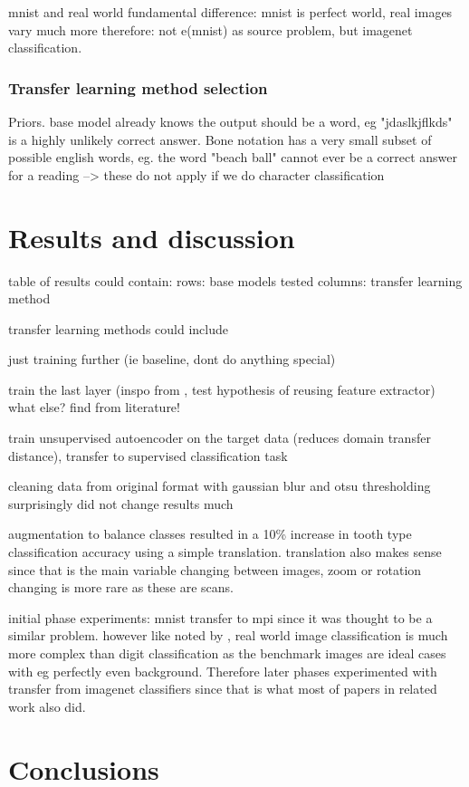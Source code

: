 \documentclass{article}
\begin{document}
mnist and real world fundamental difference: mnist is perfect world, real images vary much more \cite{alexnet}
therefore: not e(mnist) as source problem, but imagenet classification.

\subsubsection{Transfer learning method selection}
Priors. base model already knows the output should be a word, eg "jdaslkjflkds" is a highly unlikely
correct answer.
Bone notation has a very small subset of possible english words, eg. the word "beach ball" cannot ever be a correct 
answer for a reading
--> these do not apply if we do character classification


\section{Results and discussion}



table of results could contain:
rows: base models tested 
columns: transfer learning method 

transfer learning methods could include 

just training further (ie baseline, dont do anything special)

train the last layer (inspo from \cite{tibetan_ocr}, test hypothesis of reusing feature extractor)
what else? find from literature!

train unsupervised autoencoder on the target data (reduces domain transfer distance),
transfer to supervised classification task

cleaning data from original format with gaussian blur and otsu thresholding surprisingly did not 
change results much 

augmentation to balance classes resulted in a 10\% increase in tooth type classification accuracy 
using a simple translation. translation also makes sense since that is the main variable changing 
between images, zoom or rotation changing is more rare as these are scans.

initial phase experiments: mnist transfer to mpi since it was thought to be a similar problem. 
however like noted by \cite{alexnet}, real world image classification is much more complex than digit classification 
as the benchmark images are ideal cases with eg perfectly even background. Therefore later phases 
experimented with transfer from imagenet classifiers since that is what most of papers in related work also did.

\section{Conclusions}

\printbibliography
\end{document}
